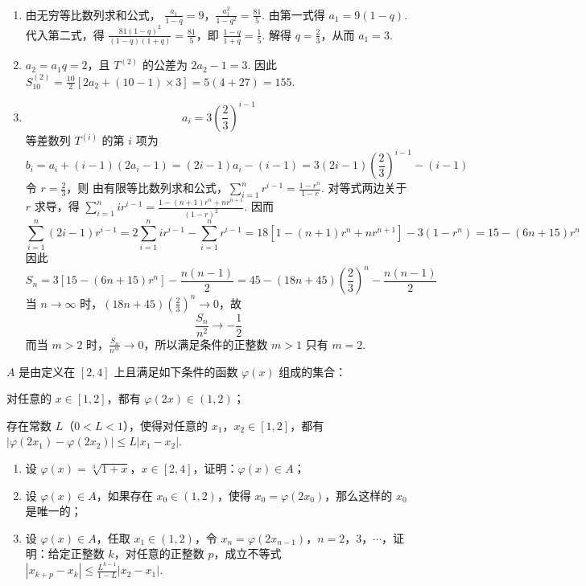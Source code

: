 \begin{solution}
\begin{enumerate}
\item 由无穷等比数列求和公式，
\(\frac{a_1}{1-q}=9\)，\(\frac{a_1^2}{1-q^2}=\frac{81}{5}\).
由第一式得 \(a_1=9(1-q)\). 代入第二式，得 \(\frac{81(1-q)^2}{(1-q)(1+q)}=\frac{81}{5}\)，即 \(\frac{1-q}{1+q}=\frac15\).
解得 \(q=\frac23\)，从而 \(a_1=3\).

\item \(a_2=a_1q=2\)，且 \(T^{(2)}\) 的公差为 \(2a_2-1=3\). 因此
\(S_{10}^{(2)}=\frac{10}{2}\left[2a_2+(10-1)\times3\right]=5(4+27)=155\).

\item
\[
a_i=3\left(\frac23\right)^{i-1}
\]
等差数列 \(T^{(i)}\) 的第 \(i\) 项为
\[
b_i=a_i+(i-1)(2a_i-1)
=(2i-1)a_i-(i-1)
=3(2i-1)\left(\frac23\right)^{i-1}-(i-1)
\]
令 \(r=\frac23\)，则
由有限等比数列求和公式，\(\sum_{i=1}^{n}r^{i-1}=\frac{1-r^n}{1-r}\). 对等式两边关于 \(r\) 求导，得 \(\sum_{i=1}^{n}ir^{i-1}=\frac{1-(n+1)r^n+nr^{n+1}}{(1-r)^2}\). 因而
\[
\sum_{i=1}^{n}(2i-1)r^{i-1}
=2\sum_{i=1}^{n}ir^{i-1}-\sum_{i=1}^{n}r^{i-1}
=18\left[1-(n+1)r^n+nr^{n+1}\right]-3(1-r^n)
=15-(6n+15)r^n
\]
因此
\[
S_n=3\left[15-(6n+15)r^n\right]-\frac{n(n-1)}2
=45-(18n+45)\left(\frac23\right)^n-\frac{n(n-1)}2
\]
当 \(n\to\infty\) 时，\((18n+45)(\frac{2}{3})^n\to0\)，故
\[
\frac{S_n}{n^2}\to-\frac12
\]
而当 \(m>2\) 时，\(\frac{S_n}{n^m}\to0\)，所以满足条件的正整数 \(m>1\) 只有 \(m=2\).
\end{enumerate}
\end{solution}

\begin{problem}
\(A\) 是由定义在 \([2,4]\) 上且满足如下条件的函数 \(\varphi(x)\) 组成的集合：

\begin{circlelist}
\item 对任意的 \(x \in [1,2]\)，都有 \(\varphi(2x) \in (1,2)\)；
\item 存在常数 \(L\)（\(0 < L < 1\)），使得对任意的 \(x_1\)，\(x_2 \in [1,2]\)，都有 \(|\varphi(2x_1) - \varphi(2x_2)| \leqslant L|x_1 - x_2|\).
\end{circlelist}

\begin{enumerate}
\item 设 \(\varphi(x) = \sqrt[3]{1 + x}\)，\(x \in [2,4]\)，证明：\(\varphi(x) \in A\)；
\item 设 \(\varphi(x) \in A\)，如果存在 \(x_0 \in (1,2)\)，使得 \(x_0 = \varphi(2x_0)\)，那么这样的 \(x_0\) 是唯一的；
\item 设 \(\varphi(x) \in A\)，任取 \(x_1 \in (1,2)\)，令 \(x_n = \varphi(2x_{n-1})\)，\(n = 2\)，\(3\)，\(\cdots\)，证明：给定正整数 \(k\)，对任意的正整数 \(p\)，成立不等式 \(|x_{k+p} - x_k| \leqslant \frac{L^{k-1}}{1 - L} |x_2 - x_1|\).
\end{enumerate}
\end{problem}

